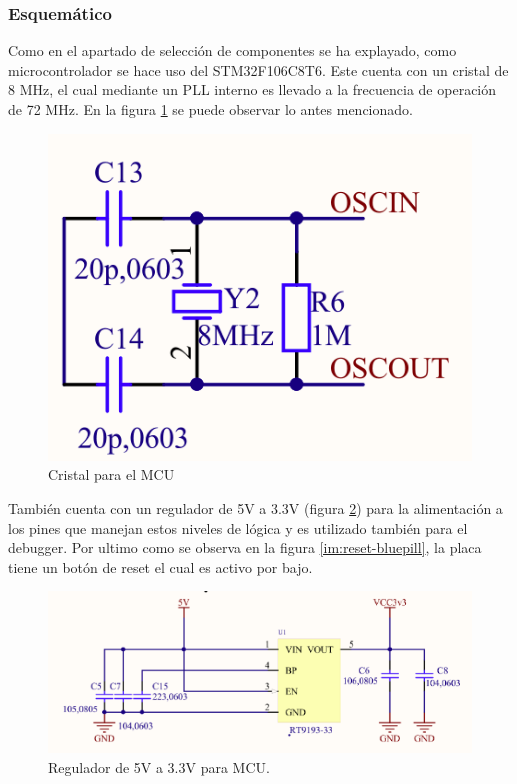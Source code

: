 \subsubsection{Esquemático}
\par Como en el apartado de selección de componentes se ha explayado, como microcontrolador se hace uso del STM32F106C8T6. Este 
cuenta con un cristal de 8 MHz, el cual mediante un PLL interno es llevado a la frecuencia de operación de 72 MHz. En la
figura \ref{cristal_bluepill} se puede observar lo antes mencionado.

\begin{figure}[!h]
	\centering
	\includegraphics[scale=0.35]{images/central/bluepill-osc.png}
    \caption{Cristal para el MCU}
	\label{cristal_bluepill}
\end{figure}

\par También cuenta con un regulador de 5V a 3.3V (figura \ref{im:reg-bluepill}) para la alimentación a los pines que manejan estos niveles de lógica y es utilizado también para el debugger. Por ultimo como se observa en la figura \ref{im:reset-bluepill}, la placa tiene un botón de reset el cual es activo por bajo. 

\begin{figure}[!h]
	\centering
	\includegraphics[scale=0.6]{images/central/bluepill-reg.png}
    \caption{Regulador de 5V a 3.3V para MCU.}
	\label{im:reg-bluepill}
\end{figure}

